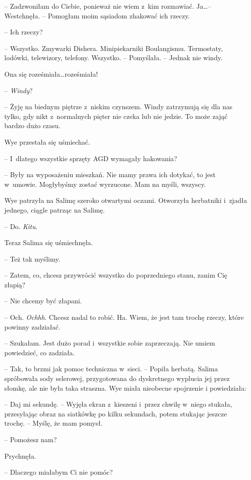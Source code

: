 \documentclass[oneside,polish,11pt,sfheadings]{mwbk}
\begin{document}
-- Zadzwoniłam do Ciebie, ponieważ nie wiem z~kim rozmawiać. Ja\ldots  -- Westchnęła. -- Pomogłam moim sąsiadom zhakować ich rzeczy.

-- Ich rzeczy?

-- Wszystko. Zmywarki Dishera. Minipiekarniki Boulangismu. Termostaty,
lodówki, telewizory, telefony. Wszystko. -- Pomyślała. -- Jednak nie
windy.

Ona się roześmiała\ldots  roześmiała! 

-- \textit{Windy}?

-- Żyję na biednym piętrze z~niskim czynszem. Windy zatrzymują się dla
nas tylko, gdy nikt z~normalnych pięter nie czeka lub nie jedzie. To
może zająć bardzo dużo czasu.

Wye przestała się uśmiechać. 

-- I~dlatego wszystkie sprzęty AGD wymagały
hakowania?

-- Były na wyposażeniu mieszkań. Nie mamy prawa ich dotykać, to jest w~umowie. Mogłybyśmy zostać wyrzucone. Mam na myśli, wszyscy.

Wye patrzyła na Salimę szeroko otwartymi oczami. Otworzyła herbatniki i~zjadła jednego, ciągle patrząc na Salimę. 

-- Do. \textit{Kitu}.

Teraz Salima się uśmiechnęła. 

-- Też tak myślimy.

-- Zatem, co, chcesz przywrócić wszystko do poprzedniego stanu, zanim Cię
złapią?

-- Nie chcemy być złapani.

-- Och. \textit{Ochhh}. Chcesz nadal to robić. Ha. Wiem, że jest tam trochę
rzeczy, które powinny zadziałać.

-- Szukałam. Jest dużo porad i~wszystkie sobie zaprzeczają. Nie umiem
powiedzieć, co zadziała.

-- Tak, to brzmi jak pomoc techniczna w~sieci. -- Popiła herbatą. Salima
spróbowała sody selerowej, przygotowana do dyskretnego wyplucia jej
przez słomkę, ale nie była taka straszna. Wye miała nieobecne spojrzenie
i powiedziała: 

-- Daj mi sekundę. -- Wyjęła ekran z~kieszeni i~przez
chwilę w~niego stukała, przesyłając obraz na siatkówkę po kilku
sekundach, potem stukając jeszcze trochę. -- Myślę, że mam pomysł.

-- Pomożesz nam?

Prychnęła. 

-- Dlaczego miałabym Ci nie pomóc?
\end{document}
